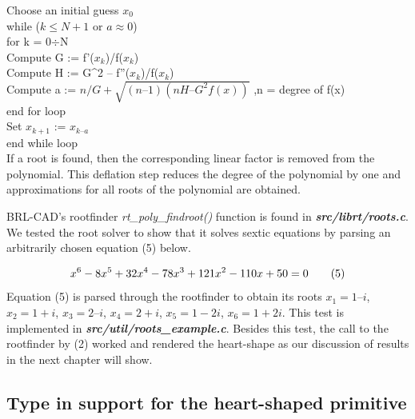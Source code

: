 Choose an initial guess $x_0$  \\
\hspace{40}while ($k \leq N+1$  or  $a \approx 0$) \\
\hspace{60}for k = 0$\div$N \\
\hspace{90}Compute  G := f'($x_k$)/f($x_k$) \\ 
\hspace{90}Compute  H := G^2 – f''($x_k$)/f($x_k$) \\ 
\hspace{90}Compute  a := $n/G + \sqrt{(n–1)(nH – G^2f(x))}$ ,n = degree of f(x) \\
\hspace{60}end for loop \\
\hspace{40}Set $x_{k+1}$ := $x_{k – a}$\\ 
\hspace{40}end while loop \\

If   a   root   is   found,   then   the   corresponding   linear   factor   is   removed   from   the  
polynomial.   This   deflation   step   reduces   the   degree   of   the   polynomial   by   one  
and approximations for all roots of the polynomial are obtained. 
 
\hspace{30} BRL-­CAD's   root­finder   \textit{rt\_poly\_findroot()}   function   is   found   in  
\textit{\textbf{src/librt/roots.c}}.   We   tested   the   root   solver   to   show   that   it   solves   sextic  
equations by parsing an arbitrarily chosen equation (5) below.  

\begin{equation*}
\centering
 x^6 -­ 8x^5 + 32x^4 - 78x^3 + 121x^2 - ­110x + 50 = 0­­­­­ \tag{5}  
\end{equation*}
Equation (5) is parsed through the   root­finder   to   obtain   its   roots   $x_1 = 1 – i$, $x_2 = 1 + i$, $x_3 = 2 – i$, $x_4 = 2 +
i$, $x_5 = 1­ - 2i$, $x_6 = 1 + 2i$. This   test   is   implemented   in   \textit{\textbf{src/util/roots\_example.c}}.  
Besides   this   test,   the   call   to   the   root­finder   by   (2)   worked   and   rendered   the  
heart-shape as our discussion of results in the next chapter will show.  

\subsection{Type in support for the heart-­shaped primitive}

